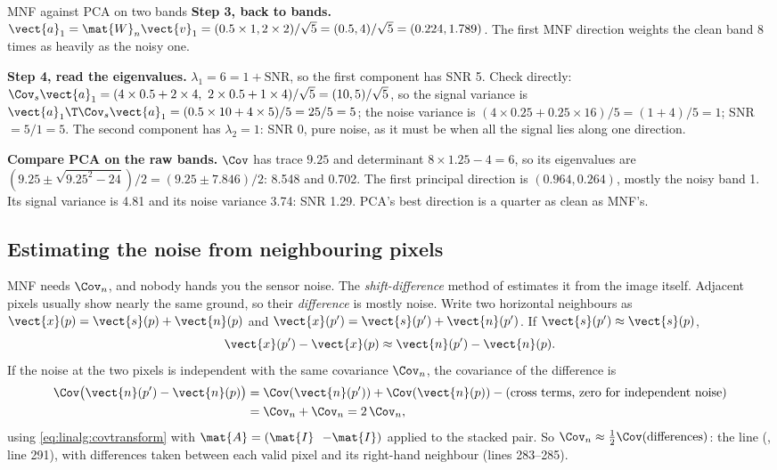 \begin{worked}[label={we:localrx:mnf2}]{MNF against PCA on two bands}
\textbf{Step 3, back to bands.} $\vect{a}_1 = \mat{W}_n\vect{v}_1 = (0.5\times1, 2\times2)/\sqrt5 = (0.5,
4)/\sqrt5 = (0.224, 1.789)$. The first MNF direction weights the clean band 8 times as heavily as the
noisy one.

\textbf{Step 4, read the eigenvalues.} $\lambda_1 = 6 = 1 + \text{SNR}$, so the first component has
SNR 5. Check directly: $\Cov_s\vect{a}_1 = (4\times0.5 + 2\times4,\ 2\times0.5 + 1\times4)/\sqrt5 =
(10, 5)/\sqrt5$, so the signal variance is $\vect{a}_1\T\Cov_s\vect{a}_1 = (0.5\times10 + 4\times5)/5 =
25/5 = 5$; the noise variance is $(4\times0.25 + 0.25\times16)/5 = (1 + 4)/5 = 1$; SNR $= 5/1 = 5$.
The second component has $\lambda_2 = 1$: SNR 0, pure noise, as it must be when all the signal lies
along one direction.

\textbf{Compare PCA on the raw bands.} $\Cov$ has trace $9.25$ and determinant
$8\times1.25 - 4 = 6$, so its eigenvalues are $(9.25 \pm \sqrt{9.25^2 - 24})/2 = (9.25 \pm 7.846)/2$:
8.548 and 0.702. The first principal direction is $(0.964, 0.264)$, mostly the noisy band 1. Its signal
variance is 4.81 and its noise variance 3.74\tagC: SNR 1.29. PCA's best direction is a quarter as clean
as MNF's.
\end{worked}

\subsection{Estimating the noise from neighbouring pixels}

MNF needs $\Cov_n$, and nobody hands you the sensor noise. The \emph{shift-difference}
method of \citet{green1988transformation} estimates it from the image itself.
Adjacent pixels usually show nearly the same ground, so their \emph{difference} is mostly noise. Write
two horizontal neighbours as $\vect{x}(p) = \vect{s}(p) + \vect{n}(p)$ and $\vect{x}(p') = \vect{s}(p') +
\vect{n}(p')$. If $\vect{s}(p') \approx \vect{s}(p)$,
\[
\vect{x}(p') - \vect{x}(p) \approx \vect{n}(p') - \vect{n}(p).
\]
If the noise at the two pixels is independent with the same covariance $\Cov_n$, the covariance of
the difference is
\begin{align*}
\Cov\big(\vect{n}(p') - \vect{n}(p)\big)
&= \Cov(\vect{n}(p')) + \Cov(\vect{n}(p)) - (\text{cross terms, zero for independent noise})\\
&= \Cov_n + \Cov_n = 2\,\Cov_n ,
\end{align*}
using \cref{eq:linalg:covtransform} with $\mat{A} = (\mat{I}\ \ {-\mat{I}})$ applied to the stacked pair.
So $\Cov_n \approx \frac12\Cov(\text{differences})$: the line
(, line 291), with differences taken between each valid pixel and its
right-hand neighbour (lines 283--285).

